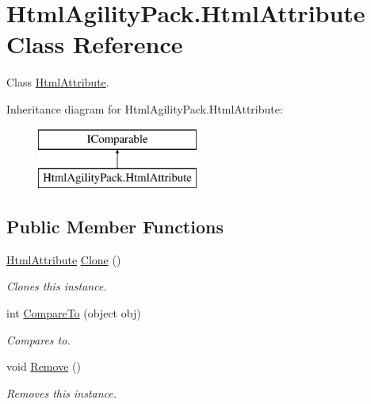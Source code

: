 \hypertarget{class_html_agility_pack_1_1_html_attribute}{}\section{Html\+Agility\+Pack.\+Html\+Attribute Class Reference}
\label{class_html_agility_pack_1_1_html_attribute}


Class \hyperlink{class_html_agility_pack_1_1_html_attribute}{Html\+Attribute}.  


Inheritance diagram for Html\+Agility\+Pack.\+Html\+Attribute\+:\begin{figure}[H]
\begin{center}
\leavevmode
\includegraphics[height=2.000000cm]{class_html_agility_pack_1_1_html_attribute}
\end{center}
\end{figure}
\subsection*{Public Member Functions}
\begin{DoxyCompactItemize}
\item 
\hyperlink{class_html_agility_pack_1_1_html_attribute}{Html\+Attribute} \hyperlink{class_html_agility_pack_1_1_html_attribute_a45f91960f8aa5f800790435a012fab94}{Clone} ()
\begin{DoxyCompactList}\small\item\em Clones this instance. \end{DoxyCompactList}\item 
int \hyperlink{class_html_agility_pack_1_1_html_attribute_ab3be22f2a16485e0cb8c811d06dc2e0f}{Compare\+To} (object obj)
\begin{DoxyCompactList}\small\item\em Compares to. \end{DoxyCompactList}\item 
void \hyperlink{class_html_agility_pack_1_1_html_attribute_afb8c60be879eda1277977542584a4c8b}{Remove} ()
\begin{DoxyCompactList}\small\item\em Removes this instance. \end{DoxyCompactList}\end{DoxyCompactItemize}
